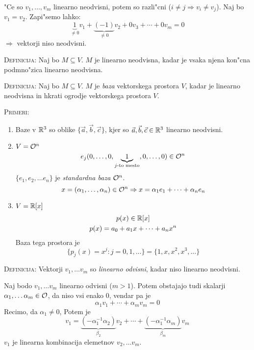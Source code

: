 "Ce so $v_1, \ldots, v_m$ linearno neodvisni, potem so razli"cni ($i \neq j \Rightarrow v_i \neq v_j$). Naj bo $v_1 = v_2$. Zapi"semo lahko:
\begin{equation*}
\underbrace{1}_{\neq 0}v_1 + \underbrace{(-1)}_{\neq 0}v_2 + 0v_3 + \cdots + 0v_m = 0
\end{equation*}
$\Rightarrow$ vektorji niso neodvisni.

\textsc{Definicija:} Naj bo $M \subseteq V$. $M$ je linearno neodvisna, kadar je vsaka njena kon"cna podmno"zica linearno neodvisna.

\textsc{Definicija:} Naj bo $M \subseteq V$. $M$ je \emph{baza} vektorskega prostora $V$, kadar je linearno neodvisna in hkrati ogrodje vektorskega prostora $V$.

\textsc{Primeri:}
\begin{enumerate}[1)]
	\item Baze v $\mathbb{R}^3$ so oblike $\{\vec{a}, \vec{b}, \vec{c}\}$, kjer so $\vec{a}, \vec{b}, \vec{c} \in \mathbb{R}^3$ linearno neodvisni.
	\item $V = \mathcal{O}^n$
	\begin{equation*}
	e_j  (0, \ldots, 0, \underbrace{1}_{\text{$j$-to mesto}}, 0, \ldots, 0) \in \mathcal{O}^n
	\end{equation*}
	$\{e_1, e_2, \ldots e_n\}$ je \emph{standardna baza} $\mathcal{O}^n$.
	\begin{equation*}
	x = (\alpha_1, \ldots, \alpha_n) \in \mathcal{O}^n \Rightarrow x = \alpha_1 e_1 + \cdots + \alpha_n e_n
	\end{equation*}
	
	\item $V = \mathbb{R}[x]$\\
	\begin{gather*}
		p(x) \in \mathbb{R}[x] \\
		p(x) = a_0 + a_1 x + \cdots + a_n x^n
	\end{gather*}
	Baza tega prostora je
	\begin{equation*}
	\{p_j(x) = x^j: j = 0, 1, \ldots\} = \{1, x, x^2, x^3, \ldots\}
	\end{equation*}
\end{enumerate}
%
\textsc{Definicija:} Vektorji $v_1, \ldots v_m$ so \emph{linearno odvisni}, kadar niso linearno neodvisni.

Naj bodo $v_1, \ldots v_m$ linearno odvisni ($m > 1$). Potem obstajajo tudi skalarji $\alpha_1, \ldots \alpha_m \in \mathcal{O}$, da niso vsi enako 0, vendar pa je
\begin{equation*}
\alpha_1 v_1 + \cdots + \alpha_m v_m = 0
\end{equation*}
Recimo, da $\alpha_1 \neq 0$, Potem je
\begin{equation*}
v_1 = \underbrace{(-\alpha_1^{-1} \alpha_2)}_{\beta_2}v_2 + \cdots + \underbrace{(-\alpha_1^{-1} \alpha_m)}_{\beta_m}v_m
\end{equation*}
$v_1$ je linearna kombinacija elemetnov $v_2, \ldots v_m$. 

